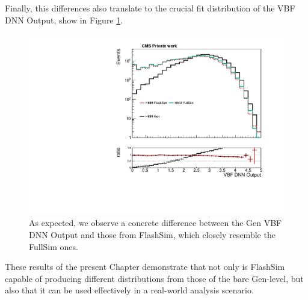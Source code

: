   Finally, this differences also translate to the crucial fit distribution of the VBF DNN Output, show in Figure \ref{fig:dnngen}.
  
  \begin{figure}
    \centering
    \includegraphics[width=\linewidth]{gfx/ch6/gen_vs_flash_DNN18Atan_noqgl___PreSel_log.pdf}
    \caption[Gen vs FlashSim for VBF DNN]{As expected, we observe a concrete difference between the Gen VBF DNN Output and those from FlashSim, which closely resemble the FullSim ones.}
    \label{fig:dnngen}
   \end{figure}
   
  These results of the present Chapter demonstrate that not only is FlashSim capable of producing different distributions from those of the bare Gen-level, but also that it can be used effectively in a real-world analysis scenario.